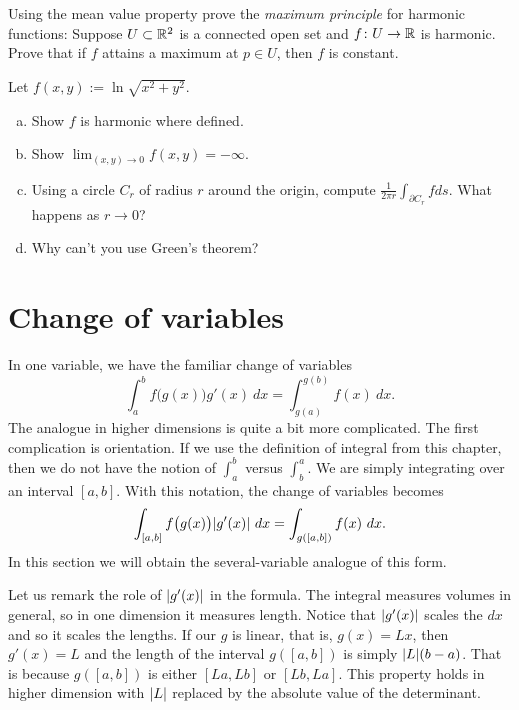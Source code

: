 \begin{exercise}
Using the mean value property prove the
\emph{maximum principle}
for harmonic functions:
Suppose $U \subset {\mathbb{R}}^2$ is a connected open set and
$f \colon U \to {\mathbb{R}}$ is harmonic. Prove that
if $f$ attains a maximum at $p \in U$, then $f$ is constant.
\end{exercise}

\begin{exercise}
Let $f(x,y) := \ln \sqrt{x^2+y^2}$.
\begin{enumerate}[a)]
\item
Show $f$ is harmonic where defined.
\item
Show $\lim_{(x,y) \to 0} f(x,y) = -\infty$.
\item
Using a circle $C_r$ of radius
$r$ around the origin, compute $\frac{1}{2\pi r} \int_{\partial C_r} f ds$.
What happens as $r \to 0$?
\item
Why can't you use Green's theorem?
\end{enumerate}
\end{exercise}



\sectionnewpage
\section{Change of variables}
\label{sec:mvchangeofvars}


In one variable, we have the familiar change of variables
\begin{equation*}
\int_a^b f\bigl(g(x)\bigr) g'(x)~ dx = 
\int_{g(a)}^{g(b)} f(x) ~ dx .
\end{equation*}
The analogue in higher dimensions is quite
a bit more complicated.  The first complication is orientation.  If we use
the definition of integral from this chapter, then we do not have the notion
of $\int_a^b$ versus $\int_b^a$.  We are simply integrating over an
interval $[a,b]$.  With this notation, the change of variables becomes
\begin{equation*}
\int_{[a,b]} f\bigl(g(x)\bigr) \lvert {g'(x)} \rvert~ dx = 
\int_{g([a,b])} f(x) ~ dx .
\end{equation*}
In this section we will obtain the several-variable analogue of this form.

Let us remark the role of $\lvert {g'(x)} \rvert$ in the formula. 
The integral measures volumes in general, so in one dimension it measures length.
Notice that $\lvert {g'(x)} \rvert$ scales the $dx$ and
so it scales the lengths.
If our $g$ is linear, that is, $g(x)=Lx$, then
$g'(x) = L$ and the length of the interval $g([a,b])$ is simply
$\lvert {L} \rvert(b-a)$.  That is because $g([a,b])$ is either $[La,Lb]$ or
$[Lb,La]$.  This property holds in higher dimension with $\lvert {L} \rvert$ replaced
by the absolute value of the determinant.

